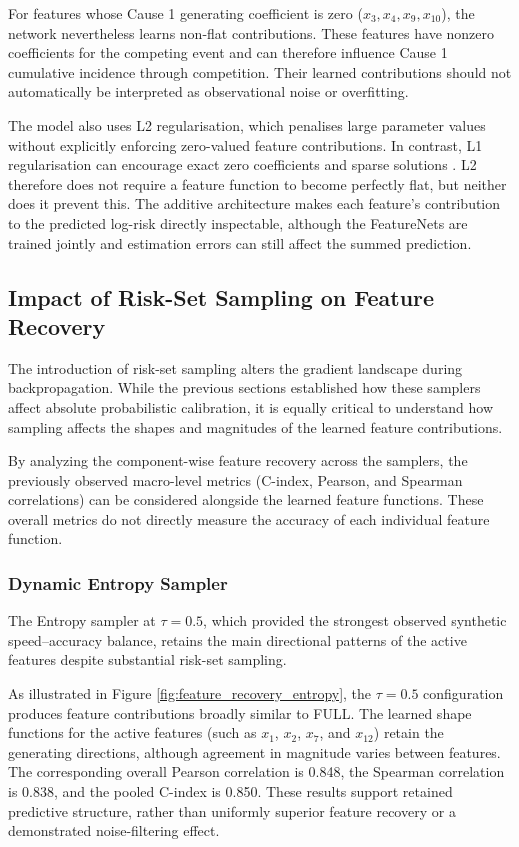\documentclass[a4paper,twoside,12pt]{report}
\begin{document}
For features whose Cause 1 generating coefficient is zero ($x_3, x_4, x_9, x_{10}$), the network nevertheless learns non-flat contributions. These features have nonzero coefficients for the competing event and can therefore influence Cause 1 cumulative incidence through competition. Their learned contributions should not automatically be interpreted as observational noise or overfitting.

The model also uses L2 regularisation, which penalises large parameter values without explicitly enforcing zero-valued feature contributions. In contrast, L1 regularisation can encourage exact zero coefficients and sparse solutions \citep{tibshirani1996}. L2 therefore does not require a feature function to become perfectly flat, but neither does it prevent this. The additive architecture makes each feature's contribution to the predicted log-risk directly inspectable, although the FeatureNets are trained jointly and estimation errors can still affect the summed prediction.


\subsection{Impact of Risk-Set Sampling on Feature Recovery}

The introduction of risk-set sampling alters the gradient landscape during backpropagation. While the previous sections established how these samplers affect absolute probabilistic calibration, it is equally critical to understand how sampling affects the shapes and magnitudes of the learned feature contributions.

By analyzing the component-wise feature recovery across the samplers, the previously observed macro-level metrics (C-index, Pearson, and Spearman correlations) can be considered alongside the learned feature functions. These overall metrics do not directly measure the accuracy of each individual feature function.

\subsubsection{Dynamic Entropy Sampler}

The Entropy sampler at $\tau=0.5$, which provided the strongest observed synthetic speed--accuracy balance, retains the main directional patterns of the active features despite substantial risk-set sampling.

As illustrated in Figure \ref{fig:feature_recovery_entropy}, the $\tau=0.5$ configuration produces feature contributions broadly similar to FULL. The learned shape functions for the active features (such as $x_1$, $x_2$, $x_7$, and $x_{12}$) retain the generating directions, although agreement in magnitude varies between features. The corresponding overall Pearson correlation is 0.848, the Spearman correlation is 0.838, and the pooled C-index is 0.850. These results support retained predictive structure, rather than uniformly superior feature recovery or a demonstrated noise-filtering effect.
\end{document}

